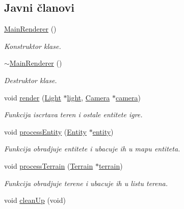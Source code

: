 \subsection*{Javni članovi}
\begin{DoxyCompactItemize}
\item 
\hyperlink{classcore_1_1MainRenderer_ab005c6e84882d475f9579f9c09b2329d}{Main\+Renderer} ()
\begin{DoxyCompactList}\small\item\em Konstruktor klase. \end{DoxyCompactList}\item 
\hyperlink{classcore_1_1MainRenderer_a1e5f39d2178a7c5738efa9be9bd486da}{$\sim$\+Main\+Renderer} ()
\begin{DoxyCompactList}\small\item\em Destruktor klase. \end{DoxyCompactList}\item 
void \hyperlink{classcore_1_1MainRenderer_a3a8f4927df78f7b0ea7c4e5902569b1e}{render} (\hyperlink{classentity_1_1Light}{Light} $\ast$\hyperlink{namespacecore_a2324d96000e7c6d42570a0577e8f070b}{light}, \hyperlink{classentity_1_1Camera}{Camera} $\ast$\hyperlink{namespacecore_a9d645c490b142886301256f6cf9c65c2}{camera})
\begin{DoxyCompactList}\small\item\em Funkcija iscrtava teren i ostale entitete igre. \end{DoxyCompactList}\item 
void \hyperlink{classcore_1_1MainRenderer_ae5ffaef40e727ab758d7b2d36ed4e92a}{process\+Entity} (\hyperlink{classentity_1_1Entity}{Entity} $\ast$\hyperlink{namespacecore_aa710c0ea388433d2d80d1d1c67582eda}{entity})
\begin{DoxyCompactList}\small\item\em Funkcija obradjuje entitete i ubacuje ih u mapu entiteta. \end{DoxyCompactList}\item 
void \hyperlink{classcore_1_1MainRenderer_a4e8a3e6729a7d948761d6e74c48a6236}{process\+Terrain} (\hyperlink{classterrain_1_1Terrain}{Terrain} $\ast$\hyperlink{namespacecore_ac45da6f80dac9bead5c9310c27897f15}{terrain})
\begin{DoxyCompactList}\small\item\em Funkcija obradjuje terene i ubacuje ih u listu terena. \end{DoxyCompactList}\item 
void \hyperlink{classcore_1_1MainRenderer_af55caf59bc4f10718a18ecb3e784b778}{clean\+Up} (void)

\end{DoxyCompactItemize}
